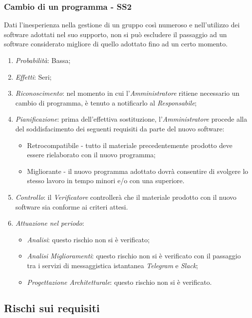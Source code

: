 \subsubsection{Cambio di un programma - SS2}
Dati l'inesperienza nella gestione di un gruppo cos\`i numeroso e nell'utilizzo dei software adottati nel suo supporto, non si pu\`o escludere il passaggio ad un software considerato migliore di quello adottato fino ad un certo momento.
\begin{enumerate}
\item \textit{Probabilit\`a}: Bassa;
\item \textit{Effetti}: Seri;
\item \textit{Riconoscimento}: nel momento in cui l'\textit{Amministratore} ritiene necessario un cambio di programma, è tenuto a notificarlo al \textit{Responsabile};
\item \textit{Pianificazione}: prima dell'effettiva sostituzione, l'\textit{Amministratore} procede alla  del soddisfacimento dei seguenti requisiti da parte del nuovo software:
  \begin{itemize}
    \item Retrocompatibile - tutto il materiale precedentemente prodotto deve essere rielaborato con il nuovo programma;
    \item Migliorante - il nuovo programma adottato dovr\`a consentire di svolgere lo stesso lavoro in tempo minori e/o con una  superiore.
  \end{itemize}
\item \textit{Controllo}: il \textit{Verificatore} controller\`a che il materiale prodotto con il nuovo software sia conforme ai criteri attesi.
\item \textit{Attuazione nel periodo}: 
	\begin{itemize}
	\item \textit{Analisi}: questo rischio non si è verificato;
	\item \textit{Analisi Miglioramenti}: questo rischio non si è verificato con il passaggio tra i servizi di messaggistica istantanea \textit{Telegram} e \textit{Slack};
	\item \textit{Progettazione Architetturale}: questo rischio non si è verificato.
	\end{itemize}
\end{enumerate}

\subsection{Rischi sui requisiti}
